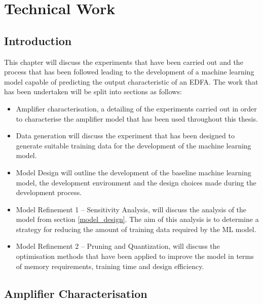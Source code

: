 \chapter{Technical Work}
\label{ch:tw}



\section{Introduction} 
\label{tw:intro}

This chapter will discuss the experiments that have been carried out and the process that has been followed leading to the development of a machine learning model capable of predicting the output characteristic of an EDFA. 
The work that has been undertaken will be split into sections as follows:
\begin{itemize}
    \item Amplifier characterisation, a detailing of the experiments carried out in order to characterise the amplifier model that has been used throughout this thesis.
    
    \item Data generation will discuss the experiment that has been designed to generate suitable training data for the development of the machine learning model.
    
    \item Model Design will outline the development of the baseline machine learning model, the development environment and the design choices made during the development process.
    
    \item Model Refinement 1 – Sensitivity Analysis, will discuss the analysis of the model from section \ref{model_design}. The aim of this analysis is to determine a strategy for reducing the amount of training data required by the ML model.
    
    \item Model Refinement 2 – Pruning and Quantization, will discuss the optimisation methods that have been applied to improve the model in terms of memory requirements, training time and design efficiency. 
\end{itemize}


\newpage
\section{Amplifier Characterisation}
\label{tw:amp_char}


